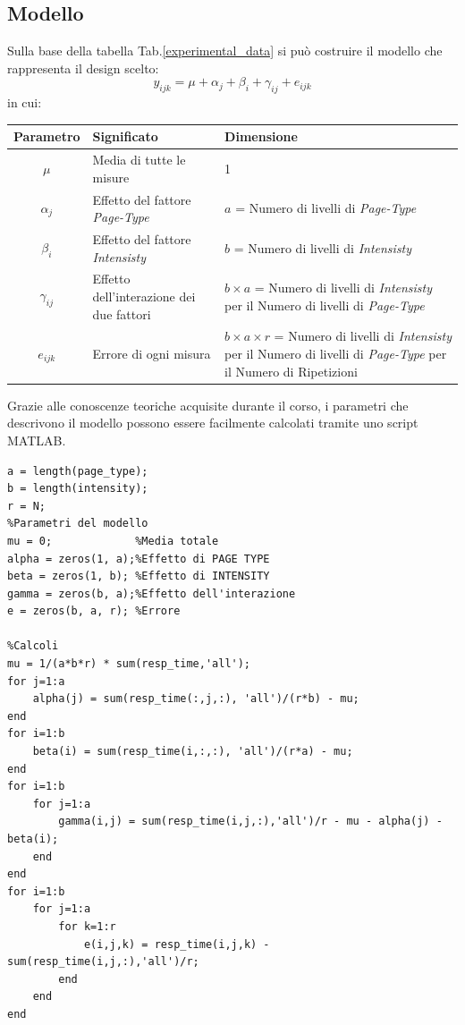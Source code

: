 \subsection{Modello}
Sulla base della tabella Tab.\ref{experimental_data} si può costruire il modello che rappresenta il design scelto:
\begin{equation}
	y_{ijk} = \mu + \alpha_j + \beta_i + \gamma_{ij} + e_{ijk}
\end{equation}
in cui:
\begin{table}[H]
	\begin{center}
		\begin{tabularx}{\textwidth}{c|X|X}
			\textbf{Parametro} & \textbf{Significato} & \textbf{Dimensione}\\
			\hline
			$\mu$ & Media di tutte le misure & 1 \\
			\hline
			$ \alpha_j $ & Effetto del fattore \textit{Page-Type} & $a$ = Numero di livelli di \textit{Page-Type} \\
			\hline
			$ \beta_i $ & Effetto del fattore \textit{Intensisty} & $b$ = Numero di livelli di \textit{Intensisty} \\
			\hline
			$ \gamma_{ij} $ & Effetto dell'interazione dei due fattori & $b\times a$ = Numero di livelli di \textit{Intensisty} per il Numero di livelli di \textit{Page-Type}  \\
			\hline
			$ e_{ijk} $ & Errore di ogni misura & $b\times a\times r$ = Numero di livelli di \textit{Intensisty} per il Numero di livelli di \textit{Page-Type} per il Numero di Ripetizioni  \\
			
		\end{tabularx}
	\end{center}
\end{table}
Grazie alle conoscenze teoriche acquisite durante il corso, i parametri che descrivono il modello possono essere facilmente calcolati tramite uno script MATLAB.
\begin{verbatim}
a = length(page_type);
b = length(intensity);
r = N;
%Parametri del modello
mu = 0;             %Media totale
alpha = zeros(1, a);%Effetto di PAGE TYPE
beta = zeros(1, b); %Effetto di INTENSITY
gamma = zeros(b, a);%Effetto dell'interazione
e = zeros(b, a, r); %Errore

%Calcoli
mu = 1/(a*b*r) * sum(resp_time,'all');
for j=1:a
	alpha(j) = sum(resp_time(:,j,:), 'all')/(r*b) - mu;
end
for i=1:b
	beta(i) = sum(resp_time(i,:,:), 'all')/(r*a) - mu;
end
for i=1:b
	for j=1:a
		gamma(i,j) = sum(resp_time(i,j,:),'all')/r - mu - alpha(j) - beta(i);
	end
end
for i=1:b
	for j=1:a
		for k=1:r
			e(i,j,k) = resp_time(i,j,k) - sum(resp_time(i,j,:),'all')/r;
		end
	end
end
\end{verbatim}
